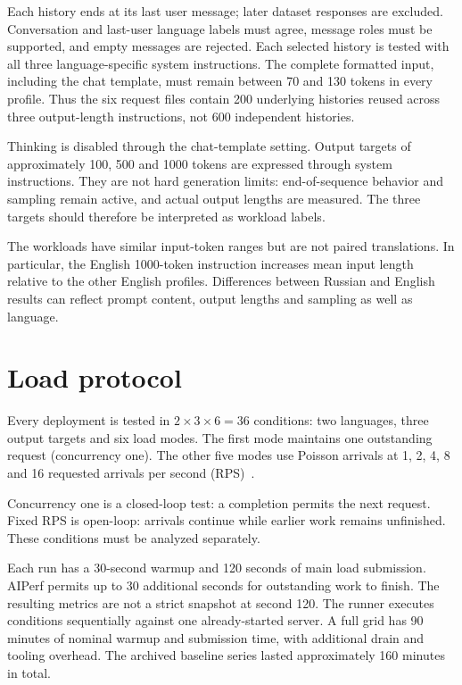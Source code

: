 Each history ends at its last user message; later dataset responses are excluded. Conversation and last-user language labels must agree, message roles must be supported, and empty messages are rejected. Each selected history is tested with all three language-specific system instructions. The complete formatted input, including the chat template, must remain between 70 and 130 tokens in every profile. Thus the six request files contain 200 underlying histories reused across three output-length instructions, not 600 independent histories.

Thinking is disabled through the chat-template setting. Output targets of approximately 100, 500 and 1000 tokens are expressed through system instructions. They are not hard generation limits: end-of-sequence behavior and sampling remain active, and actual output lengths are measured. The three targets should therefore be interpreted as workload labels.



The workloads have similar input-token ranges but are not paired translations. In particular, the English 1000-token instruction increases mean input length relative to the other English profiles. Differences between Russian and English results can reflect prompt content, output lengths and sampling as well as language.

\section{Load protocol}
Every deployment is tested in $2\times3\times6=36$ conditions: two languages, three output targets and six load modes. The first mode maintains one outstanding request (concurrency one). The other five modes use Poisson arrivals at 1, 2, 4, 8 and 16 requested arrivals per second (RPS)~\cite{procedure}.

Concurrency one is a closed-loop test: a completion permits the next request. Fixed RPS is open-loop: arrivals continue while earlier work remains unfinished. These conditions must be analyzed separately.

Each run has a 30-second warmup and 120 seconds of main load submission. AIPerf permits up to 30 additional seconds for outstanding work to finish. The resulting metrics are not a strict snapshot at second 120. The runner executes conditions sequentially against one already-started server. A full grid has 90 minutes of nominal warmup and submission time, with additional drain and tooling overhead. The archived baseline series lasted approximately 160 minutes in total.

